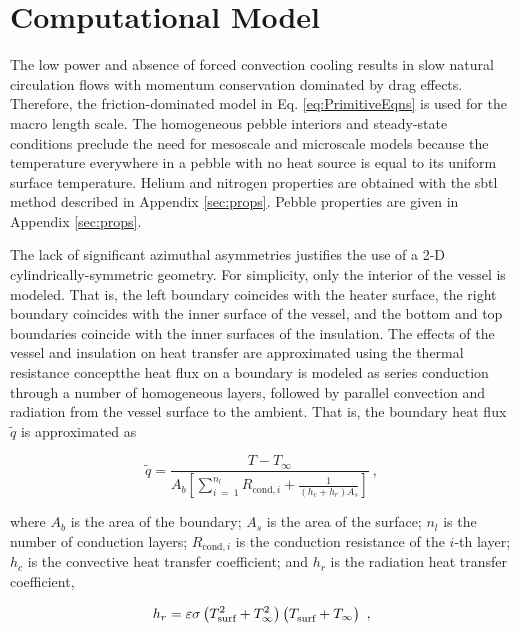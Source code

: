 \section{Computational Model}
\label{sec:model}

The low power and absence of forced convection cooling results in slow natural circulation flows with momentum conservation dominated by drag effects. Therefore, the friction-dominated model in Eq. \eqref{eq:PrimitiveEqns} is used for the macro length scale. The homogeneous pebble interiors and steady-state conditions preclude the need for mesoscale and microscale models because the temperature everywhere in a pebble with no heat source is equal to its uniform surface temperature. Helium and nitrogen properties are obtained with the \gls{sbtl} method described in Appendix \ref{sec:props}. Pebble properties are given in Appendix \ref{sec:props}.

The lack of significant azimuthal asymmetries justifies the use of a 2-D cylindrically-symmetric geometry. For simplicity, only the interior of the vessel is modeled. That is, the left boundary coincides with the heater surface, the right boundary coincides with the inner surface of the vessel, and the bottom and top boundaries coincide with the inner surfaces of the insulation. The effects of the vessel and insulation on heat transfer are approximated using the thermal resistance concept\mdash the heat flux on a boundary is modeled as series conduction through a number of homogeneous layers, followed by parallel convection and radiation from the vessel surface to the ambient. That is, the boundary heat flux \(\tilde{q}\) is approximated as

\begin{equation}
\label{eq:ThermalResistanceBC}
\tilde{q}=\frac{T-T_\infty}{A_b\left\lbrack\sum_{i\ =\ 1}^{n_l}R_{\text{cond},i}+\frac{1}{\left(h_c+h_r\right)A_s}\right\rbrack}\ ,
\end{equation}

\noindent where \(A_b\) is the area of the boundary; \(A_s\) is the area of the surface; \(n_l\) is the number of conduction layers; \(R_{\text{cond},i}\) is the conduction resistance of the \(i\)-th layer; \(h_c\) is the convective heat transfer coefficient; and \(h_r\) is the radiation heat transfer coefficient,

\begin{equation}
\label{eq:RadiationHTC}
h_r=\varepsilon\sigma\left(T_\text{surf}^2+T_\infty^2\right)\left(T_\text{surf}^{\color{white}1\color{black}}+T_\infty\right)\ ,
\end{equation}

